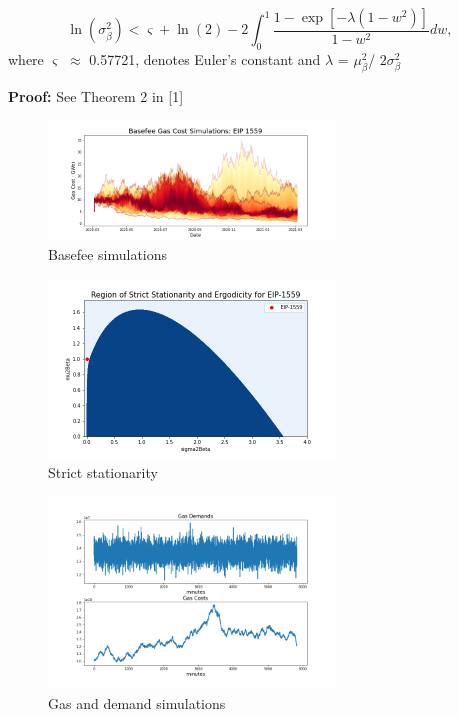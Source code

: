 \documentclass[peerreview]{ieeesyscoin}
\begin{document}
\begin{equation}
\ln(\sigma_{\beta}^2) < \varsigma + \ln(2) - 2 \int_{0}^{1}\frac{1 - \exp[-\lambda(1-w^2)]}{1-w^2}dw,
\label{eq:thm} \tag{6}
\end{equation}
where $\varsigma$ $\approx$ 0.57721, denotes Euler’s constant and $\lambda$ = $\mu_{\beta}^2$/ $2\sigma_{\beta}^2$

\textbf{Proof:} See Theorem 2 in [1]

\begin{figure}[h!]
\includegraphics[width=3in]{img/basefee_simulations.png}
\caption{Basefee simulations}  
\label{fig:basefee_simulations}
\end{figure} 

\begin{figure}[h!]
\includegraphics[width=3in]{img/strict_stationarity.png}
\caption{Strict stationarity} 
\label{fig:strict_stationarity}
\end{figure} 

\begin{figure}[h!]
\includegraphics[width=3in]{img/gas.png}
\caption{Gas and demand simulations} 
\label{fig:gas}
\end{figure} 
\end{document}
